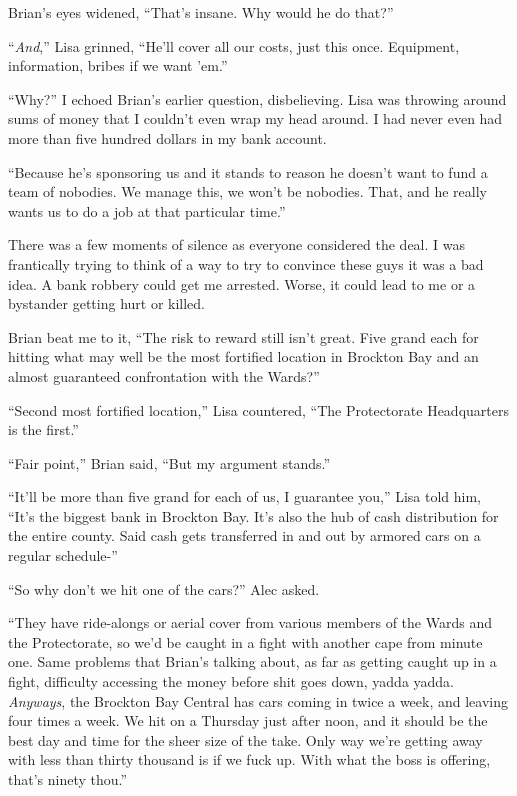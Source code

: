 Brian's eyes widened, ``That's insane.  Why would he do that?''



``\emph{And},'' Lisa grinned, ``He'll cover all our costs, just this once.  Equipment, information, bribes if we want 'em.''



``Why?'' I echoed Brian's earlier question, disbelieving.  Lisa was throwing around sums of money that I couldn't even wrap my head around.  I had never even had more than five hundred dollars in my bank account.



``Because he's sponsoring us and it stands to reason he doesn't want to fund a team of nobodies.  We manage this, we won't be nobodies.  That, and he really wants us to do a job at that particular time.''



There was a few moments of silence as everyone considered the deal.  I was frantically trying to think of a way to try to convince these guys it was a bad idea.  A bank robbery could get me arrested.  Worse, it could lead to me or a bystander getting hurt or killed.



Brian beat me to it, ``The risk to reward still isn't great.  Five grand each for hitting what may well be the most fortified location in Brockton Bay and an almost guaranteed confrontation with the Wards?''



``Second most fortified location,'' Lisa countered, ``The Protectorate Headquarters is the first.''



``Fair point,'' Brian said, ``But my argument stands.''



``It'll be more than five grand for each of us, I guarantee you,'' Lisa told him, ``It's the biggest bank in Brockton Bay.  It's also the hub of cash distribution for the entire county.  Said cash gets transferred in and out by armored cars on a regular schedule-''



``So why don't we hit one of the cars?'' Alec asked.



``They have ride-alongs or aerial cover from various members of the Wards and the Protectorate, so we'd be caught in a fight with another cape from minute one.  Same problems that Brian's talking about, as far as getting caught up in a fight, difficulty accessing the money before shit goes down, yadda yadda.  \emph{Anyways}, the Brockton Bay Central has cars coming in twice a week, and leaving four times a week.  We hit on a Thursday just after noon, and it should be the best day and time for the sheer size of the take.  Only way we're getting away with less than thirty thousand is if we fuck up.  With what the boss is offering, that's ninety thou.''



